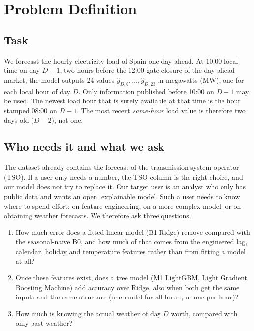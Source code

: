 \section{Problem Definition}
\label{sec:problem}

\subsection{Task}
\label{sec:task}

We forecast the hourly electricity load of Spain one day ahead. At 10:00 local time on day $D-1$,
two hours before the 12:00 gate closure of the day-ahead market, the model outputs 24 values
$\hat y_{D,0},\dots,\hat y_{D,23}$ in megawatts (MW), one for each local hour of day $D$. Only information
published before 10:00 on $D-1$ may be used. The newest load hour that is surely available at that
time is the hour stamped 08:00 on $D-1$. The most recent \emph{same-hour} load value is therefore
two days old ($D-2$), not one.

\subsection{Who needs it and what we ask}
\label{sec:questions}

The dataset already contains the forecast of the transmission system operator (TSO). If a user only
needs a number, the TSO column is the right choice, and our model does not try to replace it.
Our target user is an analyst who only has public data and wants an open, explainable model. Such a
user needs to know where to spend effort: on feature engineering, on a more complex model, or on
obtaining weather forecasts. We therefore ask three questions:
\begin{enumerate}[label=\textbf{Q\arabic*}, leftmargin=*]
  \item How much error does a fitted linear model (B1 Ridge) remove compared with the seasonal-naive
        B0, and how much of that comes from the engineered lag, calendar, holiday and temperature
        features rather than from fitting a model at all?
  \item Once these features exist, does a tree model (M1 LightGBM, Light Gradient Boosting Machine)
        add accuracy over Ridge, also when both get the same inputs and the same structure (one model
        for all hours, or one per hour)?
  \item How much is knowing the actual weather of day $D$ worth, compared with only past weather?
\end{enumerate}

